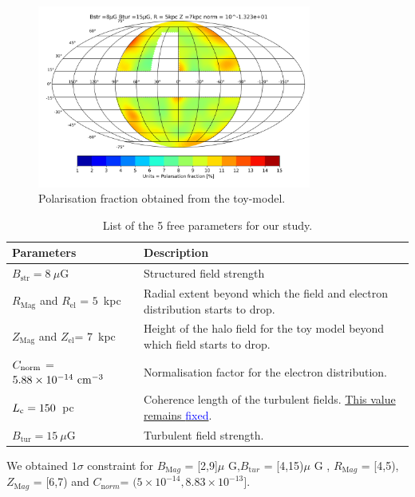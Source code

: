 \documentclass[12pt, a4 paper]{article}
\begin{document}
\begin{figure}[h!]
        \centering
        \includegraphics[width =9cm]{Images/Jan-09-2022Pol_Frac_30GHz_Total_Skymap_Bstr_8_Btur_15_Rmag_5_Zmag_7_norm_-1.32e+01.png}%
    \caption{Polarisation fraction obtained from the toy-model.}
    \label{fig:Pol_Frac}
\end{figure}

\begin{table}[h!]
  \begin{center}
    \caption{List of the 5 free parameters for our study.}
    \label{Para_table}
    \begin{tabular}{|p{4cm}|p{5cm}|} %
    \hline
      \textbf{Parameters} & \textbf{Description}\\
      \hline
      \hline
        $B_{\mathrm{str}} = 8~\mu$G &      Structured field strength \\
        \hline
        $R_{\mathrm{Mag}}$ and $R_{\mathrm{el}}$ = $5$~kpc & Radial extent beyond which the field and electron distribution starts to drop. \\
        \hline
        $Z_{\mathrm{Mag}}$ and $Z_{\mathrm{el}}$= $7$~kpc & Height of the halo field for the toy model beyond which field starts to drop.\\
        \hline
        $C_{\rm norm}$ = $5.88\times 10^{-14} ~{\rm cm}^{-3}$ & Normalisation factor for the electron distribution. \\
        \hline
        $L_{\rm c} = 150$~pc & Coherence length of the turbulent fields. \underline{This value remains \textcolor{blue}{fixed}}. \\ 
        \hline
       $B_{\mathrm{tur}} = 15~\mu$G & Turbulent field strength.\\
       \hline
    \end{tabular}
  \end{center}
\end{table}
We obtained $1\sigma$ constraint for $B_{\mathrm Mag}$ = [2,9]$\mu$ G,$B_{\mathrm tur}$ = [4,15)$\mu$ G , $R_{\mathrm Mag}$ = [4,5), $Z_{\mathrm Mag}$ = [6,7) and $C_{\mathrm norm}$= $\mathrm{(5\times 10^{-14},8.83}\times 10^{-13}]$. 
\end{document}
